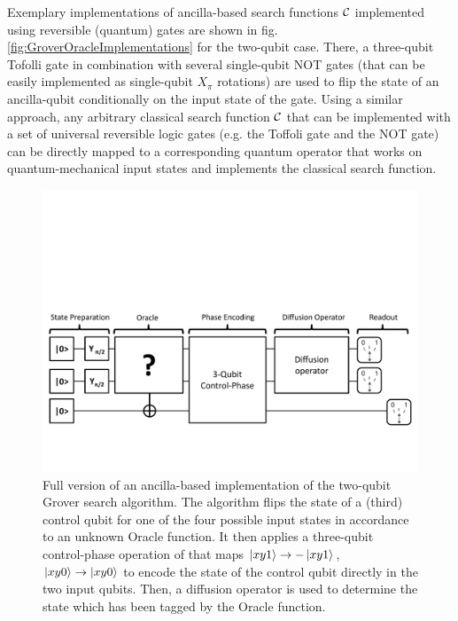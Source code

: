 \smallskip

Exemplary implementations of ancilla-based search functions $\Or$ implemented using reversible (quantum) gates are shown in fig. \ref{fig:GroverOracleImplementations} for the two-qubit case. There, a three-qubit Tofolli gate in combination with several single-qubit NOT gates (that can be easily implemented as single-qubit $X_{\pi}$ rotations) are used to flip the state of an ancilla-qubit conditionally on the input state of the gate. Using a similar approach, any arbitrary classical search function $\Or$ that can be implemented with a set of universal reversible logic gates (e.g. the Toffoli gate and the NOT gate) can be directly mapped to a corresponding quantum operator that works on quantum-mechanical input states and implements the classical search function.

\begin{figure}[ht!]
	\centering
		\includegraphics[width=1\textwidth]{./material/papers/grover/quantum_algorithm_full}
	\caption{Full version of an ancilla-based implementation of the two-qubit Grover search algorithm. The algorithm flips the state of a (third) control qubit for one of the four possible input states in accordance to an unknown Oracle function. It then applies a three-qubit control-phase operation of that maps $\left| xy1 \right>\to -\left| xy1 \right>$, $\left| xy0 \right>\to\left| xy0 \right>$ to encode the state of the control qubit directly in the two input qubits. Then, a diffusion operator is used to determine the state which has been tagged by the Oracle function.}
	\label{fig:GroverAlgorithmFullSchematic}
\end{figure}

